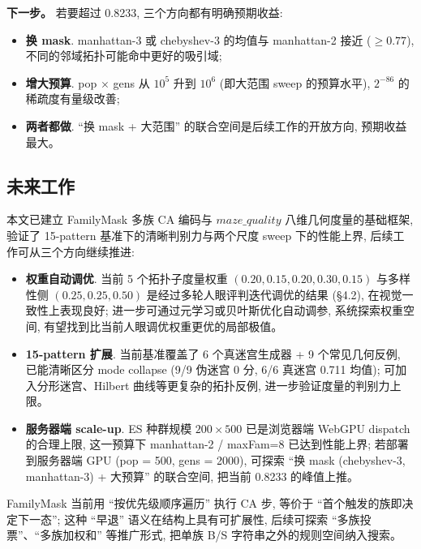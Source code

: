 \noindent\textbf{下一步。}
若要超过 0.8233, 三个方向都有明确预期收益:
\begin{itemize}[leftmargin=*, itemsep=0pt, topsep=0pt]
  \item \textbf{换 mask}. manhattan-3 或 chebyshev-3 的均值与 manhattan-2 接近 ($\ge 0.77$), 不同的邻域拓扑可能命中更好的吸引域;
  \item \textbf{增大预算}. pop $\times$ gens 从 $10^5$ 升到 $10^6$ (即大范围 sweep 的预算水平), $2^{-86}$ 的稀疏度有量级改善;
  \item \textbf{两者都做}. ``换 mask + 大范围'' 的联合空间是后续工作的开放方向, 预期收益最大。
\end{itemize}

\subsection{未来工作}

本文已建立 FamilyMask 多族 CA 编码与 $maze\_quality$ 八维几何度量的基础框架, 验证了 15-pattern 基准下的清晰判别力与两个尺度 sweep 下的性能上界, 后续工作可从三个方向继续推进:

\begin{itemize}[leftmargin=*, itemsep=0pt, topsep=0pt]
  \item \textbf{权重自动调优}. 当前 5 个拓扑子度量权重 $(0.20, 0.15, 0.20, 0.30, 0.15)$ 与多样性侧 $(0.25, 0.25, 0.50)$ 是经过多轮人眼评判迭代调优的结果 (§4.2), 在视觉一致性上表现良好; 进一步可通过元学习或贝叶斯优化自动调参, 系统探索权重空间, 有望找到比当前人眼调优权重更优的局部极值。
  \item \textbf{15-pattern 扩展}. 当前基准覆盖了 6 个真迷宫生成器 + 9 个常见几何反例, 已能清晰区分 mode collapse (9/9 伪迷宫 0 分, 6/6 真迷宫 0.711 均值); 可加入分形迷宫、Hilbert 曲线等更复杂的拓扑反例, 进一步验证度量的判别力上限。
  \item \textbf{服务器端 scale-up}. ES 种群规模 $200 \times 500$ 已是浏览器端 WebGPU dispatch 的合理上限, 这一预算下 manhattan-2 / maxFam=8 已达到性能上界; 若部署到服务器端 GPU (pop = 500, gens = 2000), 可探索 ``换 mask (chebyshev-3, manhattan-3) + 大预算'' 的联合空间, 把当前 0.8233 的峰值上推。
\end{itemize}

FamilyMask 当前用 ``按优先级顺序遍历'' 执行 CA 步, 等价于 ``首个触发的族即决定下一态''; 这种 ``早退'' 语义在结构上具有可扩展性, 后续可探索 ``多族投票''、``多族加权和'' 等推广形式, 把单族 B/S 字符串之外的规则空间纳入搜索。
